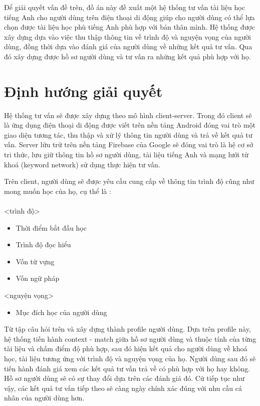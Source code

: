 Để giải quyết vấn đề trên, đồ án	 này đề xuất một hệ thống tư vấn tài liệu học tiếng Anh cho người dùng trên điện thoại di động giúp cho người dùng có thể lựa chọn được tài liệu học phù tiếng Anh phù hợp với bản thân mình. Hệ thống được xây dựng dựa vào việc thu thập thông tin về trình độ và nguyện vọng của người dùng, đồng thời dựa vào đánh giá của người dùng về những kết quả tư vấn. Qua đó xây dựng được hồ sơ người dùng và tư vấn ra những kết quả phù hợp với họ. 

\section{Định hướng giải quyết}

Hệ thống tư vấn sẽ được xây dựng theo mô hình client-server. Trong đó client sẽ là ứng dụng điện thoại di động được viết trên nền tảng Android đóng vai trò một giao diện tương tác, thu thập và xử lý thông tin người dùng và trả về kết quả tư vấn. Server lữu trữ trên nền tảng Firebase của Google sẽ đóng vai trò là hệ cơ sở tri thức, lưu giữ thông tin hồ sơ người dùng, tài liệu tiếng Anh và mạng lưới từ khoá (keyword network) sử dụng thực hiện tư vấn. 

Trên client, người dùng sẽ được yêu cầu cung cấp về thông tin trình độ cũng như mong muốn học của họ, cụ thể là : \\\\
<trình độ>
\begin{itemize}  
        \item Thời điểm bắt đầu học 
        \item Trình độ đọc hiểu
        \item Vốn từ vựng
        \item Vốn ngữ pháp 
    \end{itemize}
<nguyện vọng>  
\begin{itemize}  
        \item Mục đích học của người dùng
    \end{itemize}
    
Từ tập câu hỏi trên và xây dựng thành profile người dùng. Dựa trên profile này, hệ thống tiến hành context - match giữa hồ sơ người dùng và thuộc tính của từng tài liệu và chấm điểm độ phù hợp, sau đó hiện kết quả cho người dùng về khoá học, tài liệu tương ứng với trình độ và nguyện vọng của họ. Người dùng sau đó sẽ tiến hành đánh giá xem các kết quả tư vấn trả về có phù hợp với họ hay không. Hồ sơ người dùng sẽ có sự thay đổi dựa trên các đánh giá đó. Cứ tiếp tục như vậy, các kết quả tư vấn tiếp theo sẽ càng ngày chính xác đúng với nhu cầu cá nhân của người dùng hơn.

